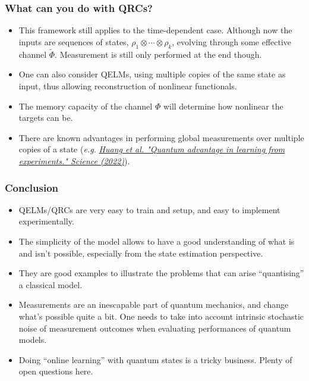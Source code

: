 \documentclass{beamer}
\begin{document}
\begin{frame}
\frametitle{What can you do with QRCs?}

\begin{itemize}
    \item This framework still applies to the time-dependent case. Although now the inputs are sequences of states, $\rho_1\otimes\cdots\otimes\rho_k$, evolving through some effective channel $\tilde\Phi$. Measurement is still only performed at the end though.
    \item One can also consider QELMs, using multiple copies of the same state as input, thus allowing reconstruction of nonlinear functionals.
    \item The memory capacity of the channel $\Phi$ will determine how nonlinear the targets can be.
    \item There are known advantages in performing global measurements over multiple copies of a state (\textit{e.g.} \href{https://www.science.org/doi/10.1126/science.abn7293}{\textit{Huang et al. "Quantum advantage in learning from experiments." Science (2022)}}).
\end{itemize}

\end{frame}


\begin{frame}
  \frametitle{Conclusion}
  \begin{itemize}
      \item QELMs/QRCs are very easy to train and setup, and easy to implement experimentally.
      \item The simplicity of the model allows to have a good understanding of what is and isn't possible, especially from the state estimation perspective.
      \item They are good examples to illustrate the problems that can arise ``quantising'' a classical model.
      \item Measurements are an inescapable part of quantum mechanics, and change what's possible quite a bit. One needs to take into account intrinsic stochastic noise of measurement outcomes when evaluating performances of quantum models.
      \item Doing ``online learning'' with quantum states is a tricky business. Plenty of open questions here.
  \end{itemize}
\end{frame}
\end{document}
